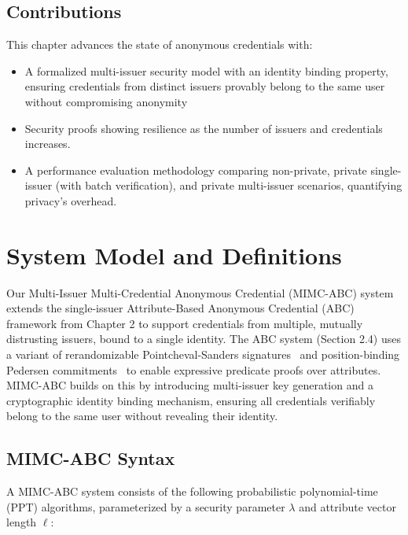 \subsection{Contributions}
This chapter advances the state of anonymous credentials with:
\begin{itemize}
    \item A formalized multi-issuer security model with an identity binding property, ensuring credentials from distinct issuers provably belong to the same user without compromising anonymity
    \item Security proofs showing resilience as the number of issuers and credentials increases.
    \item A performance evaluation methodology comparing non-private, private single-issuer (with batch verification), and private multi-issuer scenarios, quantifying privacy’s overhead.
\end{itemize}






\section{System Model and Definitions}

Our Multi-Issuer Multi-Credential Anonymous Credential (MIMC-ABC) system extends the single-issuer Attribute-Based Anonymous Credential (ABC) framework from Chapter 2 to support credentials from multiple, mutually distrusting issuers, bound to a single identity. The ABC system (Section 2.4) uses a variant of rerandomizable Pointcheval-Sanders signatures~\cite{sako_short_2016} and position-binding Pedersen commitments~\cite{tomescu_utt_2022} to enable expressive predicate proofs over attributes. MIMC-ABC builds on this by introducing multi-issuer key generation and a cryptographic identity binding mechanism, ensuring all credentials verifiably belong to the same user without revealing their identity.

\subsection{MIMC-ABC Syntax}

A MIMC-ABC system consists of the following probabilistic polynomial-time (PPT) algorithms, parameterized by a security parameter $\lambda$ and attribute vector length $\ell$:

